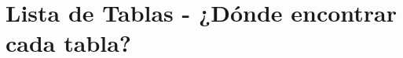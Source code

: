 \clearpage
\section{Lista de Tablas - ¿Dónde encontrar cada tabla?}\label{sec:spmp-5}
\makeatletter{}\makeatother
